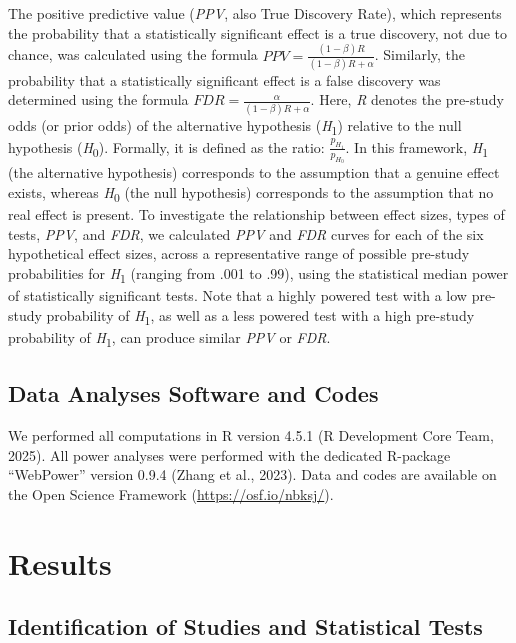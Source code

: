 \documentclass[authordate, meta, issue]{jote-new-article}
\begin{document}
	The positive predictive value (\emph{PPV}, also True Discovery Rate), which represents the probability that a statistically significant effect is a true discovery, not due to chance, was calculated using the formula $PPV=\frac{(1-\beta)R}{(1-\beta)R+\alpha}$. Similarly, the probability that a statistically significant effect is a false discovery was determined using the formula $FDR=\frac{\alpha}{(1-\beta)R+\alpha}$. Here, \emph{R} denotes the pre-study odds (or prior odds) of the alternative hypothesis (\emph{H}\textsubscript{1}) relative to the null hypothesis (\emph{H}\textsubscript{0}). Formally, it is defined as the ratio: $\frac{p_{H_1}}{p_{H_0}}$. In this framework, \emph{H}\textsubscript{1} (the alternative hypothesis) corresponds to the assumption that a genuine effect exists, whereas \emph{H}\textsubscript{0} (the null hypothesis) corresponds to the assumption that no real effect is present. To investigate the relationship between effect sizes, types of tests, \emph{PPV}, and \emph{FDR}, we calculated \emph{PPV} and \emph{FDR} curves for each of the six hypothetical effect sizes, across a representative range of possible pre-study probabilities for \emph{H}\textsubscript{1} (ranging from .001 to .99), using the statistical median power of statistically significant tests. Note that a highly powered test with a low pre-study probability of \emph{H}\textsubscript{1}, as well as a less powered test with a high pre-study probability of \emph{H}\textsubscript{1}, can produce similar \emph{PPV} or \emph{FDR}.



	\subsection{Data Analyses Software and Codes}



	We performed all computations in R version 4.5.1 (R Development Core Team, 2025). All power analyses were performed with the dedicated R-package “WebPower” version 0.9.4 (Zhang et al., 2023). Data and codes are available on the Open Science Framework (\url{https://osf.io/nbksj/}).



	\section{Results}



	\subsection{Identification of Studies and Statistical Tests}
\end{document}
